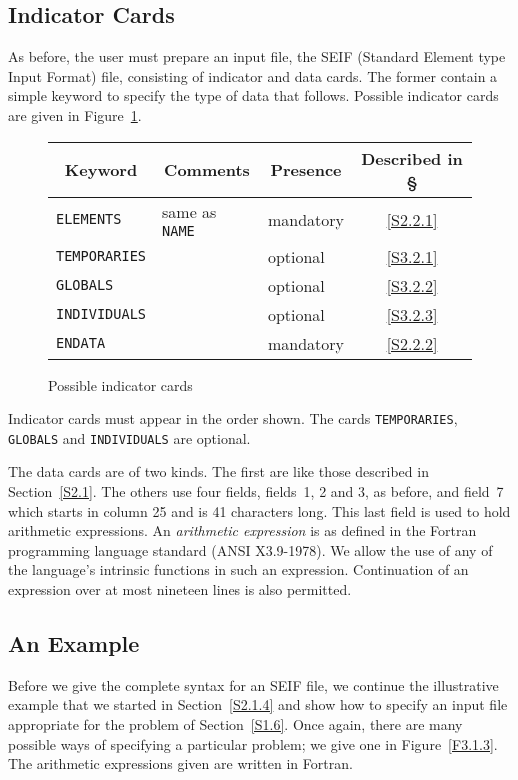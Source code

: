 \documentclass[a4paper]{article}
\newcommand{\bcftable}[1]{\begin{figure}[htbp]
                          \begin{center}
                          \begin{tabular}{#1} }
\newcommand{\ecftable}[1]{\end{tabular}
                          \caption{#1}
                          \end{center}
                          \end{figure} }
\begin{document}
\subsection{\label{S3.1.2}Indicator Cards}

As  before, the user must prepare  an input  file, the SEIF  (Standard
Element type   Input Format)
file, consisting  of indicator and  data cards.
The former contain a simple keyword to  specify the type  of data that
follows.  Possible indicator cards
are given in Figure~\ref{F3.1}.

{\small
\bcftable{lllc}
\multicolumn{1}{c}{Keyword} &
\multicolumn{1}{c}{Comments} &
\multicolumn{1}{c}{Presence} &
Described in \S \\
\hline
{\tt ELEMENTS}    &  same as {\tt NAME} & mandatory & \ref{S2.2.1} \\
{\tt TEMPORARIES} &                     & optional  & \ref{S3.2.1} \\
{\tt GLOBALS}     &                     & optional  & \ref{S3.2.2} \\
{\tt INDIVIDUALS} &                     & optional  & \ref{S3.2.3} \\
{\tt ENDATA}      &                     & mandatory & \ref{S2.2.2} \\
\hline
\ecftable{\label{F3.1}Possible indicator cards}
}

Indicator cards must appear  in   the order shown.    The  cards
{\tt TEMPORARIES}, {\tt GLOBALS} and {\tt INDIVIDUALS} are optional.

The data cards are of two kinds. The first are like those described in
Section~\ref{S2.1}. The others use four fields,  fields~1, 2 and 3, as
before, and field~7  which starts  in column 25  and is  41 characters
long.  This  last field is  used to hold  arithmetic  expressions.  An
{\em arithmetic expression} is as  defined in the  Fortran
programming language standard (ANSI  X3.9-1978).  We allow  the use of
any of the   language's intrinsic functions  in   such an  expression.
Continuation  of an expression over at   most nineteen  lines  is also
permitted.

\subsection{\label{S3.1.3}An Example}

Before we give the complete  syntax for an SEIF  file, we continue the
illustrative example that we started in Section~\ref{S2.1.4}  and show
how to  specify  an input   file   appropriate  for   the problem   of
Section~\ref{S1.6}.   Once again, there  are   many  possible ways  of
specifying a particular problem;  we give one  in Figure~\ref{F3.1.3}.
The arithmetic expressions given are written in Fortran.
\end{document}
